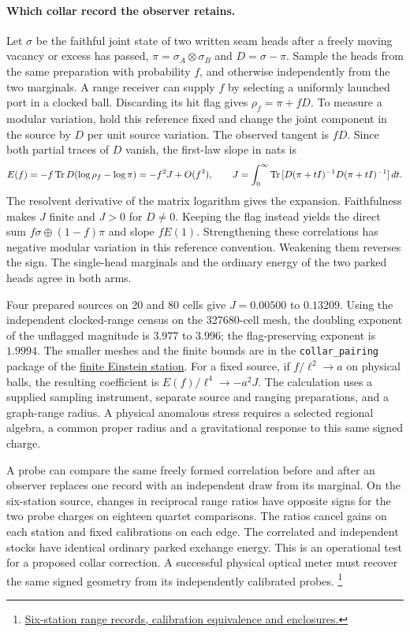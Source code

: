 \documentclass[11pt]{article}
\begin{document}
\paragraph{Which collar record the observer retains.}
\label{par:collar-index-variation}
Let $\sigma$ be the faithful joint state of two written seam heads after
a freely moving vacancy or excess has passed, $\pi=\sigma_A\otimes\sigma_B$
and $D=\sigma-\pi$. Sample the heads from the same preparation with probability
$f$, and otherwise independently from the two marginals. A range receiver can
supply $f$ by selecting a uniformly launched port in a clocked ball.
Discarding its hit flag gives $\rho_f=\pi+fD$. To measure a modular
variation, hold this reference fixed and change the joint component in
the source by $D$ per unit source variation. The observed tangent is $fD$.
Since both partial traces of $D$ vanish, the first-law slope in nats is
\[
 E(f)=-f\,{\rm Tr}\,D(\log\rho_f-\log\pi)
      =-f^2 J+O(f^3),\qquad
 J=\int_0^\infty {\rm Tr}\,[D(\pi+tI)^{-1}D(\pi+tI)^{-1}]\,dt .
\]
The resolvent derivative of the matrix logarithm gives the expansion.
Faithfulness makes $J$ finite and $J>0$ for $D\ne0$. Keeping the flag
instead yields the direct sum $f\sigma\oplus(1-f)\pi$ and slope $fE(1)$.
Strengthening these correlations has negative modular variation in this
reference convention. Weakening them reverses the sign. The single-head
marginals and the ordinary energy of the two parked heads agree in both arms.

Four prepared sources on 20 and 80 cells give $J=0.00500$ to $0.13209$.
Using the independent clocked-range census on the 327680-cell mesh,
the doubling exponent of the unflagged magnitude is $3.977$ to $3.996$;
the flag-preserving exponent is $1.9994$. The smaller meshes and the finite
bounds are in the
\texttt{collar\_pairing} package of the
\href{https://github.com/FloatingPragma/observer-patch-holography/tree/main/model/experiments/interval_echo_einstein_station}{finite Einstein station}.
For a fixed source, if $f/\ell^2\to a$ on physical balls, the resulting
coefficient is $E(f)/\ell^4\to-a^2J$. The calculation uses a supplied sampling
instrument, separate source and ranging preparations, and a graph-range
radius. A physical anomalous stress requires a selected regional algebra,
a common proper radius and a gravitational response to this same signed charge.

A probe can compare the same freely formed correlation before and after
an observer replaces one record with an independent draw from its
marginal. On the six-station source, changes in reciprocal range ratios
have opposite signs for the two probe charges on eighteen quartet
comparisons. The ratios cancel gains on each station and fixed
calibrations on each edge. The correlated and independent stocks have
identical ordinary parked exchange energy. This is an operational
test for a proposed collar correction. A successful physical optical
meter must recover the same signed geometry from its independently
calibrated probes.%
\footnote{\href{https://github.com/FloatingPragma/observer-patch-holography/tree/main/code/matched_einstein_limit/source_implication/full_geometry/station_balls/reciprocal_screen/range_contraction/formed_ranges}{Six-station range records, calibration equivalence and enclosures.}}
\end{document}
